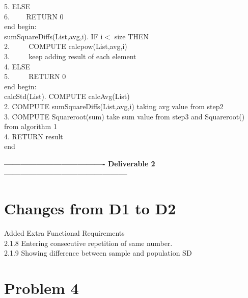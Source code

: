 \documentclass[a4paper,12pt]{article}
\begin{document}
\begin{titlepage}
\begin{algorithm}
5. ELSE\\
6. $\hspace{2em}$RETURN 0\\
end\newline
begin:\\
sumSquareDiffs(List,avg,i). IF i$<$ size THEN\\
2. $\hspace{2em}$ COMPUTE calcpow(List,avg,i) \\
3. $\hspace{2em}$ keep adding result of each element\\
4. ELSE\\
5. $\hspace{2em}$ RETURN 0\\
end\newline
begin:\\
calcStd(List). COMPUTE calcAvg(List)\\
2. COMPUTE sumSquareDiffs(List,avg,i) taking avg value from step2\\
3. COMPUTE Squareroot(sum) take sum value from step3 and Squareroot() from algorithm 1\\
4. RETURN result\\
end\newline
\end{algorithm}
\newpage
\textbf{-------------------------------------  Deliverable 2   ---------------------------------------------}
\section{Changes from D1 to D2}
Added Extra Functional Requirements\\
2.1.8 Entering consecutive repetition of same number.\\
2.1.9 Showing difference between  sample and population SD

\section{Problem 4} 

\end{titlepage}
\end{document}
